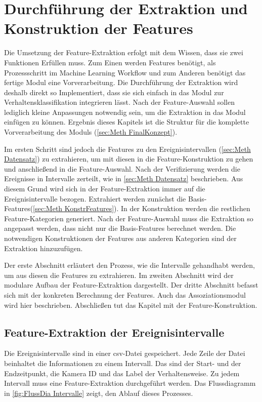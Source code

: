  \section{Durchführung der Extraktion und Konstruktion der Features}
Die Umsetzung der Feature-Extraktion erfolgt mit dem Wissen, dass sie zwei Funktionen Erfüllen muss. Zum Einen werden Features benötigt, als Prozessschritt im Machine Learning Workflow und zum Anderen benötigt das fertige Modul eine Vorverarbeitung. Die Durchführung der Extraktion wird deshalb direkt so Implementiert, dass sie sich einfach in das Modul zur Verhaltensklassifikation integrieren lässt. Nach der Feature-Auswahl sollen lediglich kleine Anpassungen notwendig sein, um die Extraktion in das Modul einfügen zu können. Ergebnis dieses Kapitels ist die Struktur für die komplette Vorverarbeitung des Moduls (\ref{sec:Meth FinalKonzept}).\par

Im ersten Schritt sind jedoch die Features zu den Ereignisintervallen (\ref{sec:Meth Datensatz}) zu extrahieren, um mit diesen in die Feature-Konstruktion zu gehen und anschließend in die Feature-Auswahl. Nach der Verifizierung werden die Ereignisse in Intervalle zerteilt, wie in \ref{sec:Meth Datensatz} beschrieben. Aus diesem Grund wird sich in der Feature-Extraktion immer auf die Ereignisintervalle bezogen. Extrahiert werden zunächst die Basis-Features(\ref{sec:Meth KonstrFeatures}). In der Konstruktion werden die restlichen Feature-Kategorien generiert. Nach der Feature-Auswahl muss die Extraktion so angepasst werden, dass nicht nur die Basis-Features berechnet werden. Die notwendigen Konstruktionen der Features aus anderen Kategorien sind der Extraktion hinzuzufügen. \par

Der erste Abschnitt erläutert den Prozess, wie die Intervalle gehandhabt werden, um aus diesen die Features zu extrahieren. Im zweiten Abschnitt wird der modulare Aufbau der Feature-Extraktion dargestellt. Der dritte Abschnitt befasst sich mit der konkreten Berechnung der Features. Auch das Assoziationsmodul wird hier beschrieben. Abschließen tut das Kapitel mit der Feature-Konstruktion. 



\subsection{Feature-Extraktion der Ereignisintervalle} \label{sec:Umse ExtrIntervalls}
Die Ereignisintervalle sind in einer csv-Datei gespeichert. Jede Zeile der Datei beinhaltet die Informationen zu einem Intervall. Das sind der Start- und der Endzeitpunkt, die Kamera ID und das Label der Verhaltensweise. Zu jedem Intervall muss eine Feature-Extraktion durchgeführt werden. Das Flussdiagramm in \ref{fig:FlussDia Intervalle} zeigt, den Ablauf dieses Prozesses.

